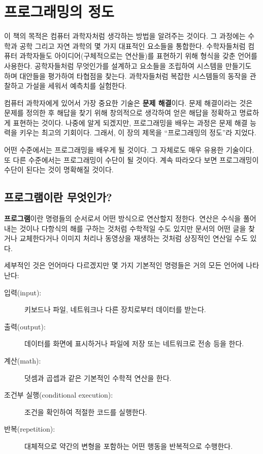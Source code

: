 \documentclass[10pt]{book}
\begin{document}
\normalsize
\clearemptydoublepage

\begin{latexonly}

\tableofcontents

\clearemptydoublepage

\end{latexonly}

\mainmatter

\chapter{프로그래밍의 정도}

이 책의 목적은 컴퓨터 과학자처럼 생각하는 방법을 알려주는 것이다.  그
과정에는 수학과 공학 그리고 자연 과학의 몇 가지 대표적인 요소들을
통합한다.  수학자들처럼 컴퓨터 과학자들도 아이디어(구체적으로는
연산들)를 표현하기 위해 형식을 갖춘 언어를 사용한다.  공학자들처럼
무엇인가를 설계하고 요소들을 조립하여 시스템을 만들기도 하며 대안들을
평가하여 타협점을 찾는다.  과학자들처럼 복잡한 시스템들의 동작을
관찰하고 가설을 세워서 예측치를 실험한다.  


컴퓨터 과학자에게 있어서 가장 중요한 기술은 {\bf 문제 해결}이다.  문제
해결이라는 것은 문제를 정의한 후 해답을 찾기 위해 창의적으로 생각하여
얻은 해답을 정확하고 명료하게 표현하는 것이다.  나중에 알게 되겠지만,
프로그래밍을 배우는 과정은 문제 해결 능력을 키우는 최고의 기회이다.
그래서, 이 장의 제목을 ``프로그래밍의 정도''라 지었다.


어떤 수준에서는 프로그래밍을 배우게 될 것이다.  그 자체로도 매우 유용한
기술이다.  또 다른 수준에서는 프로그래밍이 수단이 될 것이다.  계속
따라오다 보면 프로그래밍이 수단이 된다는 것이 명확해질 것이다.


\section{프로그램이란 무엇인가?}

{\bf 프로그램}이란 명령들의 순서로서 어떤 방식으로 연산할지
정한다.  연산은 수식을 풀어내는 것이나 다항식의 해를 구하는 것처럼
수학적일 수도 있지만 문서의 어떤 글을 찾거나 교체한다거나 이미지 처리나
동영상을 재생하는 것처럼 상징적인 연산일 수도 있다.  


세부적인 것은 언어마다 다르겠지만 몇 가지 기본적인 명령들은 거의 모든
언어에 나타난다:


\begin{description}
\item[입력(input):] 키보드나 파일, 네트워크나 다른 장치로부터 데이터를
  받는다.
\item[출력(output):] 데이터를 화면에 표시하거나 파일에 저장 또는
  네트워크로 전송 등을 한다.
\item[계산(math):] 덧셈과 곱셉과 같은 기본적인 수학적 연산을 한다.
\item[조건부 실행(conditional execution):] 조건을 확인하여 적절한
  코드를 실행한다.
\item[반복(repetition):] 대체적으로 약간의 변형을 포함하는 어떤 행동을
  반복적으로 수행한다.
\end{description}
\end{document}
